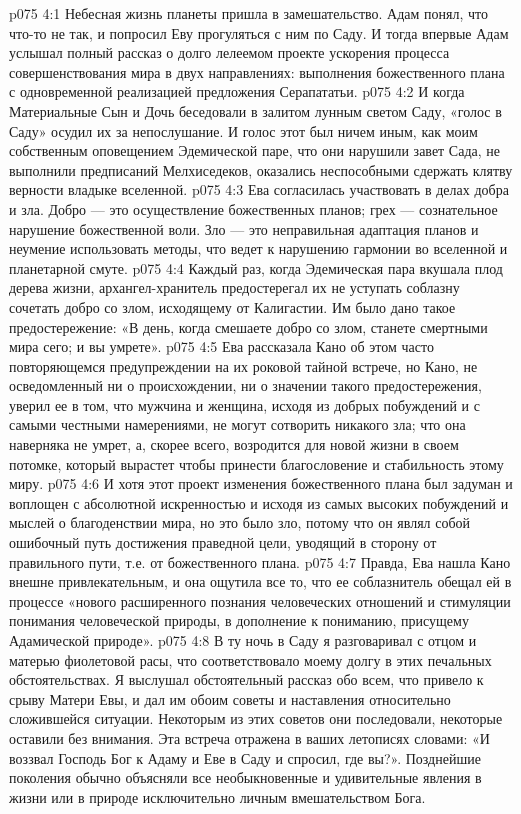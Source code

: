 \vs p075 4:1 Небесная жизнь планеты пришла в замешательство. Адам понял, что что\hyp{}то не так, и попросил Еву прогуляться с ним по Саду. И тогда впервые Адам услышал полный рассказ о долго лелеемом проекте ускорения процесса совершенствования мира в двух направлениях: выполнения божественного плана с одновременной реализацией предложения Серапататьи.
\vs p075 4:2 И когда Материальные Сын и Дочь беседовали в залитом лунным светом Саду, «голос в Саду» осудил их за непослушание. И голос этот был ничем иным, как моим собственным оповещением Эдемической паре, что они нарушили завет Сада, не выполнили предписаний Мелхиседеков, оказались неспособными сдержать клятву верности владыке вселенной.
\vs p075 4:3 Ева согласилась участвовать в делах добра и зла. Добро --- это осуществление божественных планов; грех --- сознательное нарушение божественной воли. Зло --- это неправильная адаптация планов и неумение использовать методы, что ведет к нарушению гармонии во вселенной и планетарной смуте.
\vs p075 4:4 Каждый раз, когда Эдемическая пара вкушала плод дерева жизни, архангел\hyp{}хранитель предостерегал их не уступать соблазну сочетать добро со злом, исходящему от Калигастии. Им было дано такое предостережение: «В день, когда смешаете добро со злом, станете смертными мира сего; и вы умрете».
\vs p075 4:5 Ева рассказала Кано об этом часто повторяющемся предупреждении на их роковой тайной встрече, но Кано, не осведомленный ни о происхождении, ни о значении такого предостережения, уверил ее в том, что мужчина и женщина, исходя из добрых побуждений и с самыми честными намерениями, не могут сотворить никакого зла; что она наверняка не умрет, а, скорее всего, возродится для новой жизни в своем потомке, который вырастет чтобы принести благословение и стабильность этому миру.
\vs p075 4:6 И хотя этот проект изменения божественного плана был задуман и воплощен с абсолютной искренностью и исходя из самых высоких побуждений и мыслей о благоденствии мира, но это было зло, потому что он являл собой ошибочный путь достижения праведной цели, уводящий в сторону от правильного пути, т.е. от божественного плана.
\vs p075 4:7 Правда, Ева нашла Кано внешне привлекательным, и она ощутила все то, что ее соблазнитель обещал ей в процессе «нового расширенного познания человеческих отношений и стимуляции понимания человеческой природы, в дополнение к пониманию, присущему Адамической природе».
\vs p075 4:8 В ту ночь в Саду я разговаривал с отцом и матерью фиолетовой расы, что соответствовало моему долгу в этих печальных обстоятельствах. Я выслушал обстоятельный рассказ обо всем, что привело к срыву Матери Евы, и дал им обоим советы и наставления относительно сложившейся ситуации. Некоторым из этих советов они последовали, некоторые оставили без внимания. Эта встреча отражена в ваших летописях словами: «И воззвал Господь Бог к Адаму и Еве в Саду и спросил, где вы?». Позднейшие поколения обычно объясняли все необыкновенные и удивительные явления в жизни или в природе исключительно личным вмешательством Бога.
